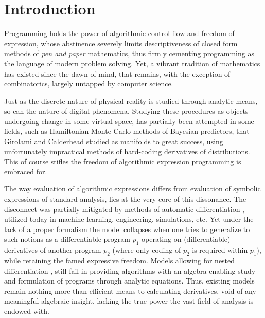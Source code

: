 \documentclass[smallcondensed]{svjour3}
\begin{document}
\section{Introduction}

Programming holds the power of algorithmic control flow and freedom of expression, whose abstinence severely limits descriptiveness of closed form methods of \textit{pen and paper} mathematics, thus firmly cementing programming as the language of modern problem solving. Yet, a vibrant tradition of mathematics has existed since the dawn of mind, that remains, with the exception of combinatorics, largely untapped by computer science. 

Just as the discrete nature of physical reality is studied through analytic means, so can the nature of digital phenomena. Studying these procedures as objects undergoing change in some virtual space, has partially been attempted in some fields, such as Hamiltonian Monte Carlo methods of Bayesian predictors, that Girolami and Calderhead \cite{StatMC} studied as manifolds to great success, using unfortunately impractical methods of hard-coding derivatives of distributions. This of course stifles the freedom of algorithmic expression programming is embraced for.

The way evaluation of algorithmic expressions differs from evaluation of symbolic expressions of standard analysis, lies at the very core of this dissonance. The disconnect was partially mitigated by methods of automatic differentiation \cite{AdSurvey}, utilized today in machine learning, engineering, simulations, etc. Yet under the lack of a proper formalism the model collapses \cite{AD2} when one tries to generalize to such notions as a differentiable program $p_1$ operating on (differentiable) derivatives of another program $p_2$ (where only coding of $p_2$ is required within $p_1$), while retaining the famed expressive freedom. 
Models allowing for nested differentiation \cite{AD1}, still fail in providing algorithms with an algebra enabling study and formulation of programs through analytic equations. Thus, existing models \cite{PcAD} \cite{ReverseAD} remain nothing more than efficient means to calculating derivatives, void of any meaningful algebraic insight, lacking the true power the vast field of analysis is endowed with.
\end{document}
